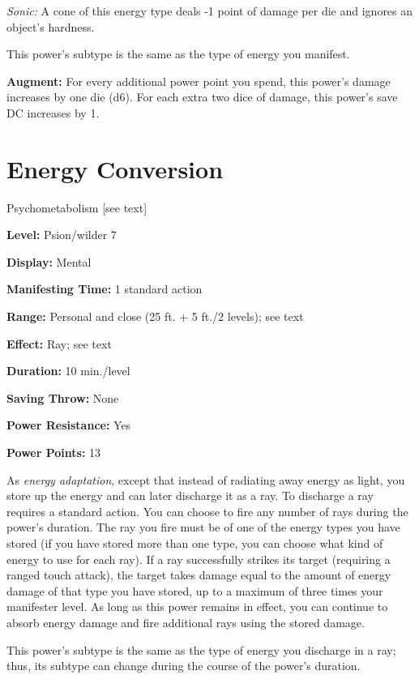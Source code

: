 \documentclass{article}
\begin{document}
\textit{Sonic: }A cone of this energy type deals -1 point of damage per die and 
ignores an object's hardness.

This power's subtype is the same as the type of energy you manifest.

\textbf{Augment:} For every additional power point you spend, this power's damage 
increases by one die (d6). For each extra two dice of damage, this power's save 
DC increases by 1.

\vspace{12pt}
\section*{Energy Conversion}

Psychometabolism [see text]

\textbf{Level:} Psion/wilder 7

\textbf{Display:} Mental

\textbf{Manifesting Time:} 1 standard action

\textbf{Range:} Personal and close (25 ft. + 5 ft./2 levels); see text

\textbf{Effect:} Ray; see text

\textbf{Duration:} 10 min./level

\textbf{Saving Throw:} None

\textbf{Power Resistance:} Yes

\textbf{Power Points:} 13

As \textit{energy adaptation}, except that instead of radiating away energy as 
light, you store up the energy and can later discharge it as a ray. To discharge 
a ray requires a standard action. You can choose to fire any number of rays during 
the power's duration. The ray you fire must be of one of the energy types you have 
stored (if you have stored more than one type, you can choose what kind of energy 
to use for each ray). If a ray successfully strikes its target (requiring a ranged 
touch attack), the target takes damage equal to the amount of energy damage of 
that type you have stored, up to a maximum of three times your manifester level. 
As long as this power remains in effect, you can continue to absorb energy damage 
and fire additional rays using the stored damage.

This power's subtype is the same as the type of energy you discharge in a ray; 
thus, its subtype can change during the course of the power's duration.

\vspace{12pt}
\end{document}
